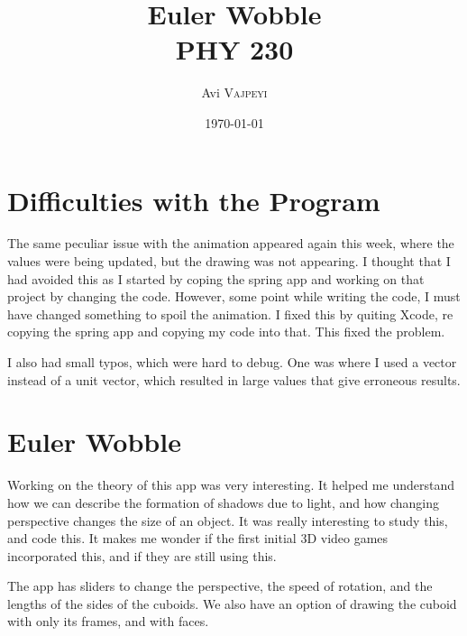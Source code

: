\documentclass{article}
\title{Euler Wobble\\ PHY 230} %
\author{Avi \textsc{Vajpeyi}} %
\date{\today} %
\begin{document}
\maketitle %





\section{Difficulties with the Program}

The same peculiar issue with the animation appeared again this week, where the values were being updated, but the drawing was not appearing. I thought that I had avoided this as I started by coping the spring app and working on that project by changing the code. However, some point while writing the code, I must have changed something to spoil the animation. I fixed this by quiting Xcode, re copying the spring app and copying my code into that. This fixed the problem.

I also had small typos, which were hard to debug. One was where I used a vector instead of a unit vector, which resulted in large values that give erroneous results.

\section {Euler Wobble}

Working on the theory of this app was very interesting. It helped me understand how we can describe the formation of shadows due to light, and how changing perspective changes the size of an object. It was really interesting to study this, and code this. It makes me wonder if the first initial 3D video games incorporated this, and if they are still using this.   

The app has sliders to change the perspective, the speed of rotation, and the lengths of the sides of the cuboids. We also have an option of drawing the cuboid with only its frames, and with faces. 

 
 
\end{document}

